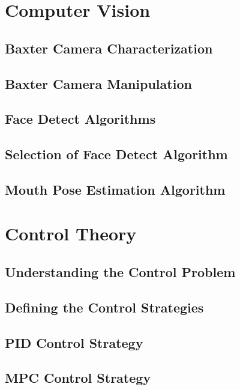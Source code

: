 \documentclass[11pt]{report} %
\begin{document}
\chapter{Computer Vision}

\section{Baxter Camera Characterization}

\section{Baxter Camera Manipulation}

\section{Face Detect Algorithms}

\section{Selection of Face Detect Algorithm}

\section{Mouth Pose Estimation Algorithm}

\chapter{Control Theory}

\section{Understanding the Control Problem}

\section{Defining the Control Strategies}

\section{PID Control Strategy}

\section{MPC Control Strategy}
\end{document}
